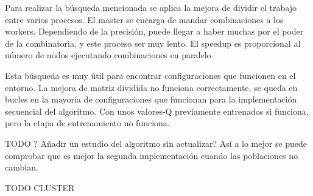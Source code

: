 Para realizar la búsqueda mencionada se aplica la mejora de dividir el trabajo entre varios procesos. El master se encarga de mandar combinaciones a los workers. Dependiendo de la precisión, puede llegar a haber muchas por el poder de la combinatoria, y este proceso ser muy lento. El speedup es proporcional al número de nodos ejecutando combinaciones en paralelo.

Esta búsqueda es muy útil para encontrar configuraciones que funcionen en el entorno.
La mejora de matriz dividida no funciona correctamente, se queda en bucles en la mayoría de configuraciones que funcionan para la implementación secuencial del algoritmo. Con unos valores-Q previamente entrenados si funciona, pero la etapa de entrenamiento no funciona.

\newpage


\vspace{1cm}

\color{blue} TODO ? Añadir un estudio del algoritmo sin actualizar? Así a lo mejor se puede comprobar que es mejor la segunda implementación cuando las poblaciones no cambian.

TODO CLUSTER
\color{black}
\newpage




